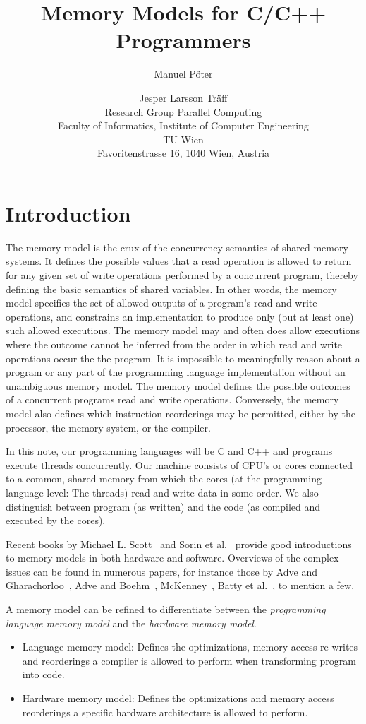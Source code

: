 \documentclass[a4paper,12pt,notitlepage,twoside,openright]{article}
\title{Memory Models for C/C++ Programmers}
\author{Manuel P\"oter \and Jesper Larsson Tr\"aff\\
Research Group Parallel Computing\\
Faculty of Informatics, Institute of Computer Engineering\\TU Wien\\
Favoritenstrasse 16, 1040 Wien, Austria}
\begin{document}
\maketitle

\section{Introduction}

The memory model is the crux of the concurrency semantics of
shared-memory systems. It defines the possible values that a read
operation is allowed to return for any given set of write operations
performed by a concurrent program, thereby defining the basic
semantics of shared variables. In other words, the memory model
specifies the set of allowed outputs of a program's read and write
operations, and constrains an implementation to produce only (but at
least one) such allowed executions. The memory model may and often
does allow executions where the outcome cannot be inferred from the
order in which read and write operations occur the the program.  It is
impossible to meaningfully reason about a program or any part of the
programming language implementation without an unambiguous memory
model. The memory model defines the possible outcomes of a concurrent
programs read and write operations.  Conversely, the memory model also
defines which instruction reorderings may be permitted, either by the
processor, the memory system, or the compiler.

In this note, our programming languages will be C and C++ and programs
execute threads concurrently. Our machine consists of CPU's or cores
connected to a common, shared memory from which the cores (at the
programming language level: The threads) read and write data in some
order. We also distinguish between program (as written) and the code
(as compiled and executed by the cores).

Recent books by Michael L. Scott~\cite{Scott13} and Sorin et
al.~\cite{SorinHillWood11} provide good introductions to memory models
in both hardware and software. Overviews of the complex issues can be
found in numerous papers, for instance those by Adve and
Gharachorloo~\cite{AdveGharachorloo96}, Adve and
Boehm~\cite{Adve:2010:MMC:1787234.1787255,AdveBoehm11},
McKenney~\cite{Mckenney:MemoryOrdering}, Batty et
al.~\cite{BattyOwenSarkarSewellWeber11,BattyMemarianNienhuisPichonSewell15},
to mention a few.

A memory model can be refined to differentiate between the
\emph{programming language memory model} and the \emph{hardware memory
  model}.
\begin{itemize}
	\item Language memory model: Defines the optimizations, memory
          access re-writes and reorderings a compiler is allowed to
          perform when transforming program into code.
	\item Hardware memory model: Defines the optimizations and
          memory access reorderings a specific hardware architecture is
          allowed to perform.
\end{itemize}
\end{document}
